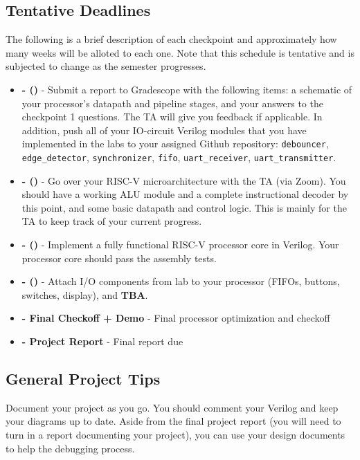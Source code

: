 \documentclass[11pt]{article}
\begin{document}
\subsection{Tentative Deadlines}
\label{tentative_deadlines}
The following is a brief description of each checkpoint and approximately how many weeks will be alloted to each one. Note that this schedule is tentative and is subjected to change as the semester progresses.


\begin{itemize}
  \item \textbf{\blockDiagramDueDate \space - \blockDiagramTaskName \space (\blockDiagramTimeAlloted)} - Submit a report to Gradescope with the following items: a schematic of your processor's datapath and pipeline stages, and your answers to the checkpoint 1 questions. The TA will give you feedback if applicable. In addition, push all of your IO-circuit Verilog modules that you have implemented in the labs to your assigned Github repository: \verb|debouncer|, \verb|edge_detector|, \verb|synchronizer|, \verb|fifo|, \verb|uart_receiver|, \verb|uart_transmitter|.
  \item \textbf{\ALUDueDate \space - \ALUTaskName \space (\ALUTimeAlloted)} - Go over your RISC-V microarchitecture with the TA (via Zoom). You should have a working ALU module and a complete instructional decoder by this point, and some basic datapath and control logic. This is mainly for the TA to keep track of your current progress.
  \item \textbf{\baseCPUDueDate \space - \baseCPUTaskName \space (\baseCPUTimeAlloted)} - Implement a fully functional RISC-V processor core in Verilog. Your processor core should pass the assembly tests.
  \item \textbf{\imageDueDate \space - \imageTaskName \space (\imageTimeAlloted)} - Attach I/O components from lab to your processor (FIFOs, buttons, switches, display), and \textbf{TBA}.
  \item \textbf{\finalCheckoffDueDate \space - Final Checkoff + Demo} - Final processor optimization and checkoff
  \item \textbf{\finalReportDueDate \space - Project Report} - Final report due
\end{itemize}

\subsection{General Project Tips}
\label{tips}
Document your project as you go.
You should comment your Verilog and keep your diagrams up to date.
Aside from the final project report (you will need to turn in a report documenting your project), you can use your design documents to help the debugging process.
\end{document}
